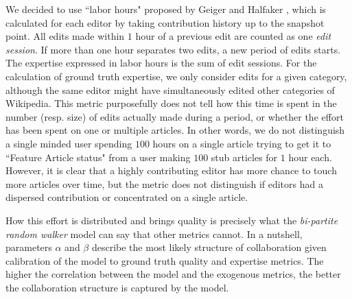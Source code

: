 We decided to use ``labor hours" proposed by Geiger and Halfaker \cite{geiger2013}, which is calculated for each editor by taking contribution history up to the snapshot point. All edits made within $1$ hour of a previous edit are counted as one {\it edit session}. If more than one hour separates two edits, a new period of edits  starts. The expertise expressed in labor hours is the sum of edit sessions. For the calculation of ground truth expertise, we only consider edits for a given category, although the same editor might have simultaneously  edited other categories of Wikipedia. This metric purposefully does not tell how this time is spent in the number (resp. size) of edits actually made during a period, or whether the effort has been spent on one or multiple articles. In other words, we do not distinguish a single minded user spending $100$ hours on a single article trying to get it to ``Feature Article status" from a user making $100$ stub articles for $1$ hour each.  However, it is clear that a highly contributing editor has more chance to touch more articles over time, but the metric does not distinguish if editors had a dispersed contribution or concentrated on a single article. 

How this effort is distributed and brings quality is precisely what the {\it bi-partite random walker} model can say that other metrics cannot. In a nutshell, parameters $\alpha$ and $\beta$ describe the most likely structure of collaboration given calibration of the model to ground truth quality and expertise metrics. The higher the correlation between the model and the exogenous metrics, the better the collaboration structure is captured by the model. 


